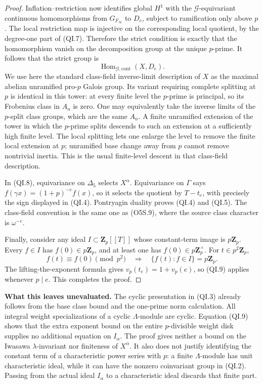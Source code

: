 \documentclass[11pt,a4paper]{article}
\theoremstyle{definition}
\renewcommand{\paragraph}[1]{\par\smallskip\noindent\textbf{#1}\quad\ignorespaces}
\begin{document}
\begin{proof}
Inflation--restriction now identifies global $H^1$ with the
$\mathcal G$-equivariant continuous homomorphisms from
$G_{F_\infty}$ to $D_e$, subject to ramification only above $p$.
The local restriction map is injective on the corresponding
local quotient, by the degree-one part of (QI.7).  Therefore the
strict condition is exactly that the homomorphism vanish on
the decomposition group at the unique $p$-prime.
It follows that the strict group is
\[
          \operatorname{Hom}_{\mathcal G,\mathrm{cont}}(X,D_e).
 \tag{QI.8}
\]
We use here the standard class-field inverse-limit description
of $X$ as the maximal abelian unramified pro-$p$ Galois group.
Its variant requiring complete splitting at $p$ is identical
in this tower: at every finite level the $p$-prime is principal,
so its Frobenius class in $A_n$ is zero.  One may equivalently
take the inverse limits of the $p$-split class groups, which
are the same $A_n$.  A finite unramified extension of the tower
in which the $p$-prime splits descends to such an extension at
a sufficiently high finite level.  The local splitting lets
one enlarge the level to remove the finite local extension
at $p$; unramified base change away from $p$ cannot remove
nontrivial inertia.  This is the usual finite-level descent
in that class-field description.

In (QI.8), equivariance on $\Delta_5$ selects $X^\alpha$.
Equivariance on $\Gamma$ says
$f(\gamma x)=(1+p)^{-e}f(x)$, so it selects the quotient by
$T-t_e$, with precisely the sign displayed in (QI.4).
Pontryagin duality proves (QI.4) and (QI.5).
The class-field convention is the same one as (O5S.9), where
the source class character is $\omega^{-e}$.

Finally, consider any ideal $I\subset\mathbf Z_p[[T]]$ whose
constant-term image is $p\mathbf Z_p$.  Every $f\in I$ has
$f(0)\in p\mathbf Z_p$, and at least one has
$f(0)\in p\mathbf Z_p^\times$.  For $t\in p^2\mathbf Z_p$,
\[
              f(t)\equiv f(0)\pmod {p^2}
              \quad\Longrightarrow\quad
              \{f(t):f\in I\}=p\mathbf Z_p.              \tag{QI.9}
\]
The lifting-the-exponent formula gives
$v_p(t_e)=1+v_p(e)$, so (QI.9) applies whenever $p\mid e$.
This completes the proof.
\end{proof}

\paragraph{What this leaves unevaluated.}
The cyclic presentation in (QI.3) already follows from the base
class bound and the one-prime norm calculation.  All integral
weight specializations of a cyclic $\Lambda$-module are cyclic.
Equation (QI.9) shows that the extra exponent bound on the entire
$p$-divisible weight disk supplies no additional equation on
$I_\alpha$.  The proof gives neither a bound on the Iwasawa
$\lambda$-invariant nor finiteness of $X^\alpha$.
It also does not justify identifying the constant term of a
characteristic power series with $p$: a finite $\Lambda$-module
has unit characteristic ideal, while it can have the nonzero
coinvariant group in (QI.2).  Passing from the actual ideal
$I_\alpha$ to a characteristic ideal discards that finite part.
\end{document}
